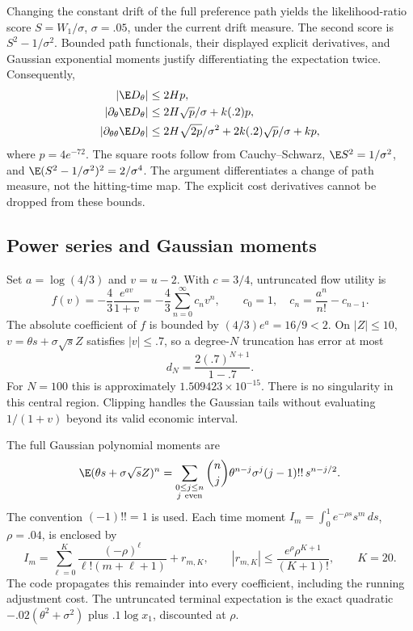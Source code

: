 Changing the constant drift of the full preference path yields the likelihood-ratio score $S=W_1/\sigma$, $\sigma=.05$, under the current drift measure. The second score is $S^2-1/\sigma^2$. Bounded path functionals, their displayed explicit derivatives, and Gaussian exponential moments justify differentiating the expectation twice. Consequently,
\begin{align}
 |\E D_\theta|&\le2Hp,\\
 |\partial_\theta\E D_\theta|&\le2H\sqrt p/\sigma+k(.2)p,\\
 |\partial_{\theta\theta}\E D_\theta|&\le2H\sqrt{2p}/\sigma^2+2k(.2)\sqrt p/\sigma+kp,
\end{align}
where $p=4e^{-72}$. The square roots follow from Cauchy--Schwarz, $\E S^2=1/\sigma^2$, and $\E(S^2-1/\sigma^2)^2=2/\sigma^4$. The argument differentiates a change of path measure, not the hitting-time map. The explicit cost derivatives cannot be dropped from these bounds.

\subsection{Power series and Gaussian moments}
Set $a=\log(4/3)$ and $v=u-2$. With $c=3/4$, untruncated flow utility is
\begin{equation}
 f(v)=-\frac43\frac{e^{av}}{1+v}=-\frac43\sum_{n=0}^{\infty}c_nv^n,
 \qquad c_0=1,\quad c_n=\frac{a^n}{n!}-c_{n-1}.
\end{equation}
The absolute coefficient of $f$ is bounded by $(4/3)e^a=16/9<2$. On $|Z|\le10$, $v=\theta s+\sigma\sqrt{s}Z$ satisfies $|v|\le.7$, so a degree-$N$ truncation has error at most
\begin{equation}
 d_N=\frac{2(.7)^{N+1}}{1-.7}.
\end{equation}
For $N=100$ this is approximately $1.509423\times10^{-15}$. There is no singularity in this central region. Clipping handles the Gaussian tails without evaluating $1/(1+v)$ beyond its valid economic interval.

The full Gaussian polynomial moments are
\begin{equation}
 \E(\theta s+\sigma\sqrt{s}Z)^n
 =\sum_{\substack{0\le j\le n\\j\ {\rm even}}}
 {n\choose j}\theta^{n-j}\sigma^j(j-1)!!\,s^{n-j/2}.
\end{equation}
The convention $(-1)!!=1$ is used. Each time moment $I_m=\int_0^1e^{-\rho s}s^m\,ds$, $\rho=.04$, is enclosed by
\begin{equation}
 I_m=\sum_{\ell=0}^{K}\frac{(-\rho)^\ell}{\ell!(m+\ell+1)}+r_{m,K},
 \qquad |r_{m,K}|\le\frac{e^{\rho}\rho^{K+1}}{(K+1)!},\qquad K=20.
\end{equation}
The code propagates this remainder into every coefficient, including the running adjustment cost. The untruncated terminal expectation is the exact quadratic $-.02(\theta^2+\sigma^2)$ plus $.1\log x_1$, discounted at $\rho$.

